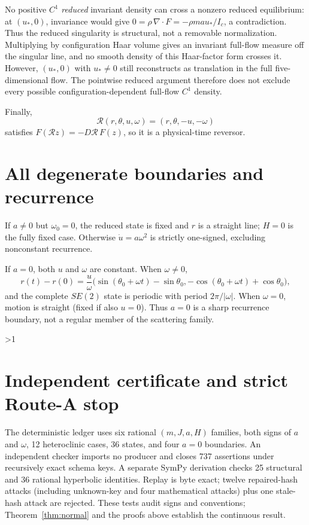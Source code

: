 \documentclass[9pt]{extarticle}
\begin{document}
No positive $C^1$ \emph{reduced} invariant density can cross a nonzero reduced
equilibrium: at $(u_*,0)$, invariance would give
$0=\rho\,\nabla\!\cdot F=-\rho ma u_*/I_c$, a contradiction.  Thus the
reduced singularity is structural, not a removable normalization.  Multiplying
by configuration Haar volume gives an invariant full-flow measure off the
singular line, and no smooth density of this Haar-factor form crosses it.
However, $(u_*,0)$ with $u_*\ne0$ still reconstructs as translation in the
full five-dimensional flow.  The pointwise reduced argument therefore does
not exclude every possible configuration-dependent full-flow $C^1$ density.

Finally,
\[
 \mathcal R(r,\theta,u,\omega)=(r,\theta,-u,-\omega)
\]
satisfies $F(\mathcal Rz)=-D\mathcal R\,F(z)$, so it is a physical-time
reversor.

\section{All degenerate boundaries and recurrence}
If $a\ne0$ but $\omega_0=0$, the reduced state is fixed and $r$ is a straight
line; $H=0$ is the fully fixed case.  Otherwise $\dot u=a\omega^2$ is strictly
one-signed, excluding nonconstant recurrence.

If $a=0$, both $u$ and $\omega$ are constant.  When $\omega\ne0$,
\[
 r(t)-r(0)=\frac{u}{\omega}
 \bigl(\sin(\theta_0+\omega t)-\sin\theta_0,
 -\cos(\theta_0+\omega t)+\cos\theta_0\bigr),
\]
and the complete $SE(2)$ state is periodic with period $2\pi/|\omega|$.  When
$\omega=0$, motion is straight (fixed if also $u=0$).  Thus $a=0$ is a sharp
recurrence boundary, not a regular member of the scattering family.
\fi

\ifnum\CRevisionRound>1
\section{Independent certificate and strict Route-A stop}
The deterministic ledger uses six rational $(m,J,a,H)$ families, both signs
of $a$ and $\omega$, 12 heteroclinic cases, 36 states, and four $a=0$
boundaries.  An independent checker imports no producer and closes 737
assertions under recursively exact schema keys.  A separate SymPy derivation
checks 25 structural and 36 rational hyperbolic identities.  Replay is byte
exact; twelve repaired-hash attacks (including unknown-key and four mathematical
attacks) plus one stale-hash attack are rejected.  These tests audit signs and
conventions; Theorem~\ref{thm:normal} and the proofs above establish the
continuous result.
\end{document}
